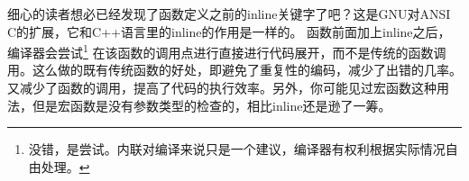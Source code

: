 \par 细心的读者想必已经发现了函数定义之前的inline关键字了吧？这是GNU对ANSI C的扩展，它和C++语言里的inline的作用是一样的。\allowbreak
函数前面加上inline之后，编译器会尝试\footnote{没错，是尝试。内联对编译来说只是一个建议，编译器有权利根据实际情况自由处理。}\allowbreak
在该函数的调用点进行直接进行代码展开，而不是传统的函数调用。这么做的既有传统函数的好处，即避免了重复性的编码，减少了出错的几率。\allowbreak
又减少了函数的调用，提高了代码的执行效率。另外，你可能见过宏函数这种用法，但是宏函数是没有参数类型的检查的，相比inline还是逊了一筹。





